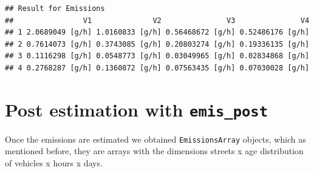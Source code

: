 \documentclass[12pt,graybox,envcountchap,sectrefs]{krantz}
\theoremstyle{definition}
\theoremstyle{definition}
\theoremstyle{definition}
\theoremstyle{remark}
\begin{document}
\begin{verbatim}
## Result for Emissions 
##                V1              V2               V3               V4
## 1 2.0689049 [g/h] 1.0160833 [g/h] 0.56468672 [g/h] 0.52486176 [g/h]
## 2 0.7614073 [g/h] 0.3743085 [g/h] 0.20803274 [g/h] 0.19336135 [g/h]
## 3 0.1116298 [g/h] 0.0548773 [g/h] 0.03049965 [g/h] 0.02834868 [g/h]
## 4 0.2768287 [g/h] 0.1360872 [g/h] 0.07563435 [g/h] 0.07030028 [g/h]
\end{verbatim}

\chapter{\texorpdfstring{Post estimation with
\texttt{emis\_post}}{Post estimation with emis\_post}}\label{post}

Once the emissions are estimated we obtained \texttt{EmissionsArray}
objects, which as mentioned before, they are arrays with the dimensions
streets x age distribution of vehicles x hours x days.
\end{document}
